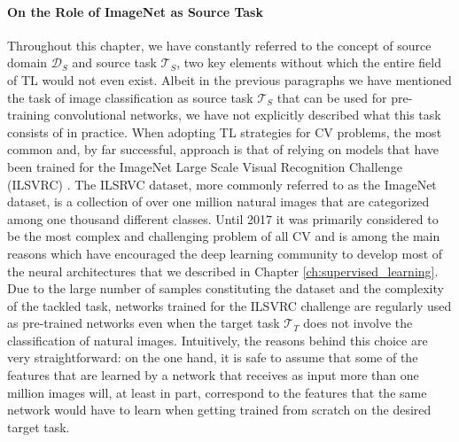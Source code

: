 \paragraph{\textbf{\uppercase{O}n the \uppercase{R}ole of \uppercase{I}mageNet as \uppercase{S}ource \uppercase{T}ask}} Throughout this chapter, we have constantly referred to the concept of source domain $\mathcal{D}_S$ and source task $\mathcal{T}_S$, two key elements without which the entire field of TL would not even exist. Albeit in the previous paragraphs we have mentioned the task of image classification as source task $\mathcal{T}_S$ that can be used for pre-training convolutional networks, we have not explicitly described what this task consists of in practice. When adopting TL strategies for CV problems, the most common and, by far successful, approach is that of relying on models that have been trained for the ImageNet Large Scale Visual Recognition Challenge (ILSVRC) \cite{russakovsky2015imagenet}. The ILSRVC dataset, more commonly referred to as the ImageNet dataset, is a collection of over one million natural images that are categorized among one thousand different classes. Until 2017 it was primarily considered to be the most complex and challenging problem of all CV and is among the main reasons which have encouraged the deep learning community to develop most of the neural architectures that we described in Chapter \ref{ch:supervised_learning}. Due to the large number of samples constituting the dataset and the complexity of the tackled task, networks trained for the ILSVRC challenge are regularly used as pre-trained networks even when the target task $\mathcal{T}_T$ does not involve the classification of natural images. Intuitively, the reasons behind this choice are very straightforward: on the one hand, it is safe to assume that some of the features that are learned by a network that receives as input more than one million images will, at least in part, correspond to the features that the same network would have to learn when getting trained from scratch on the desired target task.

